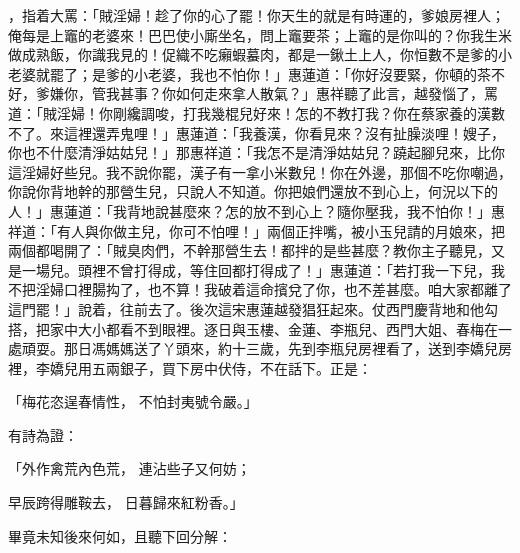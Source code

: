 \begin{showcontents}{}
，指着大罵：「賊淫婦！趁了你的心了罷！你天生的就是有時運的，爹娘房裡人；俺每是上竈的老婆來！巴巴使小廝坐名，問上竈要茶；上竈的是你叫的？你我生米做成熟飯，你識我見的！促織不吃癩蝦蟇肉，都是一鍬土上人，你恒數不是爹的小老婆就罷了；是爹的小老婆，我也不怕你！」惠蓮道：「你好沒要緊，你頓的茶不好，爹嫌你，管我甚事？你如何走來拿人散氣？」惠祥聽了此言，越發惱了，罵道：「賊淫婦！你剛纔調唆，打我幾棍兒好來！怎的不教打我？你在蔡家養的漢數不了。來這裡還弄鬼哩！」惠蓮道：「我養漢，你看見來？沒有扯臊淡哩！嫂子，你也不什麼清淨姑姑兒！」那惠祥道：「我怎不是清淨姑姑兒？蹺起腳兒來，比你這淫婦好些兒。我不說你罷，漢子有一拿小米數兒！你在外邊，那個不吃你嘲過，你說你背地幹的那營生兒，只說人不知道。你把娘們還放不到心上，何況以下的人！」惠蓮道：「我背地說甚麼來？怎的放不到心上？隨你壓我，我不怕你！」惠祥道：「有人與你做主兒，你可不怕哩！」兩個正拌嘴，被小玉兒請的月娘來，把兩個都喝開了：「賊臭肉們，不幹那營生去！都拌的是些甚麼？教你主子聽見，又是一場兒。頭裡不曾打得成，等住回都打得成了！」惠蓮道：「若打我一下兒，我不把淫婦口裡腸抅了，也不算！我破着這命擯兌了你，也不差甚麼。咱大家都離了這門罷！」說着，往前去了。後次這宋惠蓮越發猖狂起來。仗西門慶背地和他勾搭，把家中大小都看不到眼裡。逐日與玉樓、金蓮、李瓶兒、西門大姐、春梅在一處頑耍。那日馮媽媽送了丫頭來，約十三歲，先到李瓶兒房裡看了，送到李嬌兒房裡，李嬌兒用五兩銀子，買下房中伏侍，不在話下。正是：

「梅花恣逞春情性，  不怕封夷號令嚴。」

有詩為證：

「外作禽荒內色荒，  連沾些子又何妨；

早辰跨得雕鞍去，  日暮歸來紅粉香。」

畢竟未知後來何如，且聽下回分解：





\end{showcontents}


